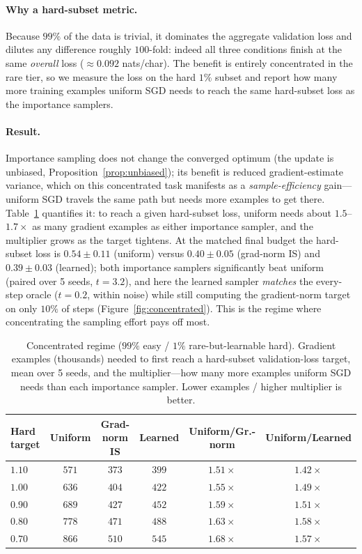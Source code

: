 \documentclass[11pt]{article}
\begin{document}
\paragraph{Why a hard-subset metric.} Because $99\%$ of the data is trivial, it
dominates the aggregate validation loss and dilutes any difference roughly
$100$-fold: indeed all three conditions finish at the same \emph{overall} loss
($\approx\!0.092$ nats/char). The benefit is entirely concentrated in the rare
tier, so we measure the loss on the hard $1\%$ subset and report how many more
training examples uniform SGD needs to reach the same hard-subset loss as the
importance samplers.

\paragraph{Result.} Importance sampling does not change the converged optimum
(the update is unbiased, Proposition~\ref{prop:unbiased}); its benefit is reduced
gradient-estimate variance, which on this concentrated task manifests as a
\emph{sample-efficiency} gain---uniform SGD travels the same path but needs more
examples to get there. Table~\ref{tab:concentrated} quantifies it: to reach a
given hard-subset loss, uniform needs about $1.5$--$1.7\times$ as many gradient
examples as either importance sampler, and the multiplier grows as the target
tightens. At the matched final budget the hard-subset loss is $0.54\pm0.11$
(uniform) versus $0.40\pm0.05$ (grad-norm IS) and $0.39\pm0.03$ (learned); both
importance samplers significantly beat uniform (paired over 5 seeds, $t=3.2$),
and here the learned sampler \emph{matches} the every-step oracle ($t=0.2$,
within noise) while still computing the gradient-norm target on only $10\%$ of
steps (Figure~\ref{fig:concentrated}). This is the regime where concentrating
the sampling effort pays off most.

\begin{table}[t]
\centering
\caption{Concentrated regime ($99\%$ easy / $1\%$ rare-but-learnable hard).
Gradient examples (thousands) needed to first reach a hard-subset validation-loss
target, mean over 5 seeds, and the multiplier---how many more examples uniform
SGD needs than each importance sampler. Lower examples / higher multiplier is
better.}
\label{tab:concentrated}
\small
\begin{tabular}{lccccc}
\toprule
Hard target & Uniform & Grad-norm IS & Learned & Uniform/Gr.-norm & Uniform/Learned \\
\midrule
$1.10$ & $571$ & $373$ & $399$ & $1.51\times$ & $1.42\times$ \\
$1.00$ & $636$ & $404$ & $422$ & $1.55\times$ & $1.49\times$ \\
$0.90$ & $689$ & $427$ & $452$ & $1.59\times$ & $1.51\times$ \\
$0.80$ & $778$ & $471$ & $488$ & $1.63\times$ & $1.58\times$ \\
$0.70$ & $866$ & $510$ & $545$ & $\mathbf{1.68\times}$ & $\mathbf{1.57\times}$ \\
\bottomrule
\end{tabular}
\end{table}
\end{document}
